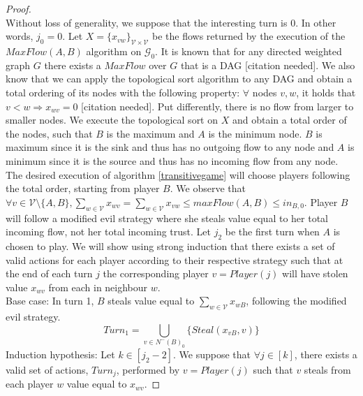 \documentclass[11pt]{llncs}
\begin{document}
    \begin{proof} \ \\
       Without loss of generality, we suppose that the interesting turn is 0. In other words, $j_0 = 0$. Let $X =
       \{x_{vw}\}_{\mathcal{V} \times \mathcal{V}}$ be the flows returned by the execution of the $MaxFlow\left(A, B\right)$
       algorithm on $\mathcal{G}_0$. It is known that for any directed weighted graph $G$ there exists a $MaxFlow$ over $G$
       that is a DAG [citation needed]. We also know that we can apply the topological sort algorithm to any DAG and obtain a
       total ordering of its nodes with the following property: $\forall$ nodes $v, w$, it holds that
       $v < w \Rightarrow x_{wv} = 0$ [citation needed]. Put differently, there is no flow from larger to smaller nodes. We
       execute the topological sort on $X$ and obtain a total order of the nodes, such that $B$ is the maximum and
       $A$ is the minimum node. $B$ is maximum since it is the sink and thus has no outgoing flow to any node and $A$ is
       minimum since it is the source and thus has no incoming flow from any node. The desired execution of algorithm
       \ref{transitivegame} will choose players following the total order, starting from player $B$. We observe that
       $\forall v \in \mathcal{V} \setminus \{A, B\}, \sum\limits_{w \in \mathcal{V}}x_{wv} = \sum\limits_{w \in
       \mathcal{V}}x_{vw} \leq maxFlow\left(A, B\right) \leq in_{B, 0}$. Player $B$ will follow a modified evil strategy
       where she steals value equal to her total incoming flow, not her total incoming trust. Let $j_2$ be the first turn
       when $A$ is chosen to play. We will show using strong induction that there exists a set of valid actions for each
       player according to their respective strategy such that at the end of each turn $j$ the corresponding player $v =
       Player\left(j\right)$ will have stolen value $x_{wv}$ from each in neighbour $w$. \\
       Base case: In turn 1, $B$ steals value equal to $\sum\limits_{w \in \mathcal{V}}x_{wB}$, following the modified evil
       strategy.
       \begin{equation}
          Turn_1 = \bigcup\limits_{v \in N^{-}\left(B\right)_0}\{Steal\left(x_{vB}, v\right)\}
       \end{equation}
       Induction hypothesis: Let $k \in [j_2 - 2]$. We suppose that $\forall j \in [k]$, there exists a valid set of actions,
       $Turn_j$, performed by $v = Player\left(j\right)$ such that $v$ steals from each player $w$ value equal to $x_{wv}$.

\end{proof}
\end{document}
